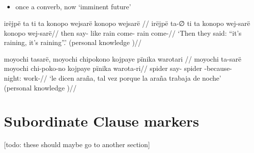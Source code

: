 \documentclass{memoir}
\begin{document}
\subsection{\texorpdfstring{ \label{sec:sareimn}}{ }}

\begin{itemize}
\tightlist
\item
  once a converb, now `imminent future'
\end{itemize}

\ex \label{ctorat-25}
\begingl \glpreamble irëjpë ta ti ta konopo wejsarë konopo wejsarë //
\gla irëjpë ta-∅ ti ta konopo wej-sarë konopo wej-sarë//
\glb then say-  like rain come- rain come-//
\glft ‘Then they said: “it’s raining, it’s raining”.’ (personal knowledge
)//
\endgl
\xe

\ex \label{ctoaragrme-25}
\begingl \glpreamble moyochi tasarë, moyochi chipokono kojpaye pïnika warotari //
\gla moyochi ta-sarë moyochi chi-poko-no kojpaye pïnika warota-ri//
\glb spider say- spider -because- night:  work-//
\glft ‘le dicen araña, tal vez porque la araña trabaja de noche’ (personal knowledge
)//
\endgl
\xe

\section{Subordinate Clause markers}

{[}todo: these should maybe go to another section{]}
\end{document}
